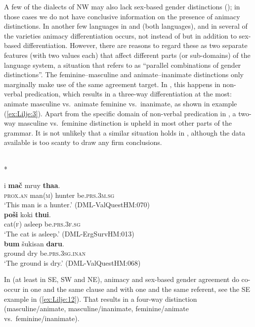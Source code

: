 \documentclass[output=collectionpaper]{langsci/langscibook}
\begin{document}
A few of the dialects of NW  may also lack sex-based gender distinctions (\citealt[150--151]{Morgenstierne1967}); in those cases we do not have conclusive information on the presence of animacy distinctions. In another few languages \textendash{} in  and  (both  languages), and in several of the  varieties \textendash{} animacy differentiation occurs, not instead of but in addition to sex-based differentiation. However, there are reasons to regard these as two separate features (with two values each) that affect different parts (or sub-domains) of the language system, a situation that \citet[581--582]{Dahl2000} refers to as ``parallel combinations of gender distinctions''. The feminine--masculine and animate--inanimate distinctions only marginally make use of the same agreement target. In , this happens in non-verbal predication, which results in a three-way differentiation at the most: animate masculine vs.\ animate feminine vs.\ inanimate, as shown in example (\ref{ex:Lilje:3}). Apart from the specific domain of non-verbal predication in , a two-way masculine vs.\ feminine distinction is upheld in most other parts of the grammar. It is not unlikely that a similar situation holds in , although the data available is too scanty to draw any firm conclusions.

\ea
\label{ex:Lilje:3}
\\*
\begin{xlist}
\ex
\gll i \textbf{mač} mruy \textbf{thaa}.    \\
\textsc{prox.an} man(\textsc{m}) hunter be\textsc{.prs.3m.sg}    \\
\glt `This man is a hunter.' (DML-ValQuestHM:070)\\
\ex
\gll \textbf{poši} koki \textbf{thui}.     \\
cat(\textsc{f}) asleep be.\textsc{prs.3f.sg}     \\
\glt `The cat is asleep.' (DML-ErgSurvHM:013)\\
\ex
\gll \textbf{bum} šukisan \textbf{daru}.     \\
ground dry be.\textsc{prs.3sg.inan}     \\
\glt `The ground is dry.' (DML-ValQuestHM:068)\\
\end{xlist}
\z

In  (at least in SE, SW and NE), animacy and sex-based gender agreement do co-occur in one and the same clause and with one and the same referent, see the SE  example in (\ref{ex:Lilje:12}). That results in a four-way distinction (masculine/animate, masculine/inanimate, feminine/animate vs.\ feminine/inanimate).
\end{document}
